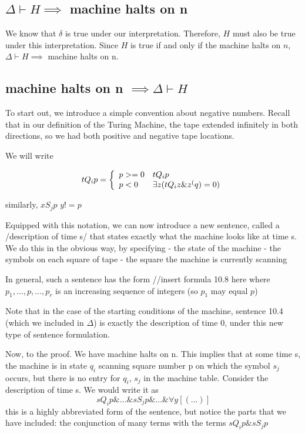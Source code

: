 \subsection{$\Delta \vdash H \implies$ machine halts on n}

We know that $\delta$ is true under our interpretation.  Therefore, $H$ must also be true under this interpretation.
Since $H$ is true if and only if the machine halts on $n$, $\Delta \vdash H \implies$ machine halts on n.

\subsection{machine halts on n $\implies \Delta \vdash H$}

To start out, we introduce a simple convention about negative numbers. Recall that in our definition of the Turing Machine, the tape extended infinitely in both directions, so we had both positive and negative tape locations.

We will write 

\[tQ_ip = \left\{\begin{array}{ll}  p >= 0 & tQ_ip \\ p < 0 & \exists z (tQ_iz \& z^(q) = 0) \end{array}\right.\]

similarly,
$xS_jp$
$y != p$

Equipped with this notation, we can now introduce a new sentence, called a /description of time s/ that states exactly what the machine looks like at time s. We do this in the obvious way, by specifying
	- the state of the machine
	- the symbols on each square of tape
	- the square the machine is currently scanning

In general, such a sentence has the form
//insert formula 10.8 here
where $p_1, \dots , p, \dots, p_r$ is an increasing sequence of integers (so $p_1$ may equal $p$)

Note that in the case of the starting conditions of the machine, sentence 10.4 (which we included in $\Delta$) is exactly the description of time 0, under this new type of sentence formulation.




Now, to the proof.
We have machine halts on n.
This implies that at some time s, the machine is in state $q_i$ scanning square number p on which the symbol $s_j$ occurs, but there is no entry for $q_i$, $s_j$ in the machine table.
Consider the description of time s. We would write it as 
\[sQ_ip \& \dots \& sS_jp \& \dots \& \forall y [(...)]\]
this is a highly abbreviated form of the sentence, but notice the parts that we have included:
	the conjunction of many terms with the terms
	$sQ_ip \& sS_jp$

